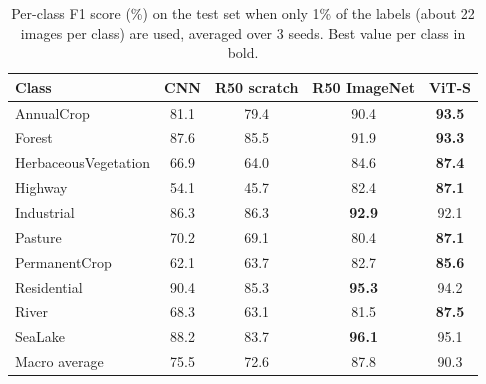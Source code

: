 \begin{table}[t]
\centering
\small
\setlength{\tabcolsep}{5pt}
\begin{tabular}{|l|c|c|c|c|}
\hline
Class & CNN & R50 scratch & R50 ImageNet & ViT-S \\ \hline \hline
AnnualCrop & 81.1 & 79.4 & 90.4 & \textbf{93.5} \\
Forest & 87.6 & 85.5 & 91.9 & \textbf{93.3} \\
HerbaceousVegetation & 66.9 & 64.0 & 84.6 & \textbf{87.4} \\
Highway & 54.1 & 45.7 & 82.4 & \textbf{87.1} \\
Industrial & 86.3 & 86.3 & \textbf{92.9} & 92.1 \\
Pasture & 70.2 & 69.1 & 80.4 & \textbf{87.1} \\
PermanentCrop & 62.1 & 63.7 & 82.7 & \textbf{85.6} \\
Residential & 90.4 & 85.3 & \textbf{95.3} & 94.2 \\
River & 68.3 & 63.1 & 81.5 & \textbf{87.5} \\
SeaLake & 88.2 & 83.7 & \textbf{96.1} & 95.1 \\
\hline Macro average & 75.5 & 72.6 & 87.8 & 90.3 \\ \hline
\end{tabular}
\caption{Per-class F1 score (\%) on the test set when only 1\% of the labels (about 22 images per class) are used, averaged over 3 seeds. Best value per class in bold.}
\label{tab:f1}
\end{table}